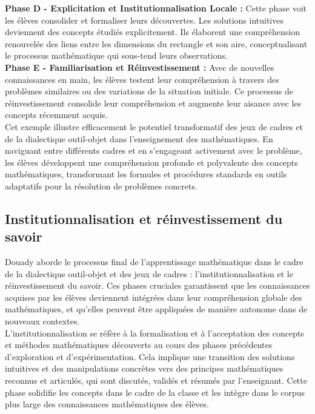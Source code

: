 \textbf{Phase D - Explicitation et Institutionnalisation Locale :}
Cette phase voit les élèves consolider et formaliser leurs découvertes.
Les solutions intuitives deviennent des concepts étudiés explicitement.
Ils élaborent une compréhension renouvelée des liens entre les dimensions du rectangle et son aire,
conceptualisant le processus mathématique qui sous-tend leurs observations.\\

\textbf{Phase E - Familiarisation et Réinvestissement :}
Avec de nouvelles connaissances en main,
les élèves testent leur compréhension à travers des problèmes similaires ou des variations de la situation initiale.
Ce processus de réinvestissement consolide leur compréhension et augmente leur aisance avec les concepts récemment acquis.\\

Cet exemple illustre efficacement le potentiel transformatif des jeux de cadres et de la dialectique outil-objet dans l'enseignement des mathématiques.
En naviguant entre différents cadres et en s'engageant activement avec le problème,
les élèves développent une compréhension profonde et polyvalente des concepts mathématiques,
transformant les formules et procédures standards en outils adaptatifs pour la résolution de problèmes concrets.

\subsection{Institutionnalisation et réinvestissement du savoir}

Douady aborde le processus final de l'apprentissage mathématique dans le cadre de la dialectique outil-objet et des jeux de cadres :
l'institutionnalisation et le réinvestissement du savoir.
Ces phases cruciales garantissent que les connaissances acquises par les élèves deviennent intégrées dans leur compréhension globale des mathématiques,
et qu'elles peuvent être appliquées de manière autonome dans de nouveaux contextes.\\

L'institutionnalisation se réfère à la formalisation et à l'acceptation des concepts et méthodes mathématiques découverts au cours des phases précédentes d'exploration et d'expérimentation.
Cela implique une transition des solutions intuitives et des manipulations concrètes vers des principes mathématiques reconnus et articulés,
qui sont discutés,
validés et résumés par l'enseignant.
Cette phase solidifie les concepts dans le cadre de la classe et les intègre dans le corpus plus large des connaissances mathématiques des élèves.\\

